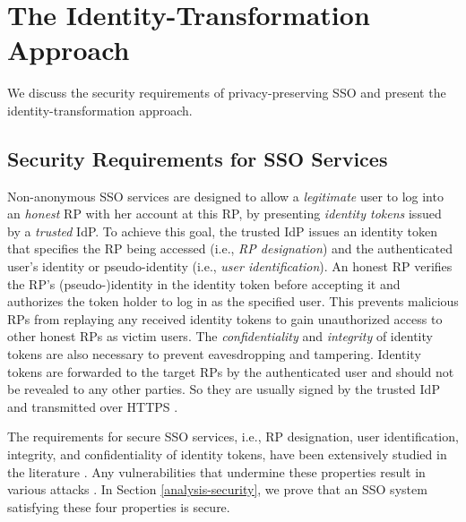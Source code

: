 \section{The Identity-Transformation Approach}
\label{sec:challenge}

We discuss the security requirements of privacy-preserving SSO and present the identity-transformation approach.


\subsection{Security Requirements for SSO Services}
\label{subsec:basicrequirements}

Non-anonymous SSO services \cite{OpenIDConnect,rfc6749,SAML,SAMLIdentifier,NIST2017draft} are designed to allow a \emph{legitimate} user to log into an \emph{honest} RP with her account at this RP, %
by presenting \emph{identity tokens} issued by a \emph{trusted} IdP.
To achieve this goal, the trusted IdP issues an identity token that specifies the RP being accessed (i.e., \emph{RP designation}) and the authenticated user's identity or pseudo-identity (i.e., \emph{user identification}).
An honest RP verifies the RP's (pseudo-)identity in the identity token before accepting it and authorizes the token holder to log in as the specified user. This prevents malicious RPs from replaying any received identity tokens to gain unauthorized access to other honest RPs as victim users.
The \emph{confidentiality} and \emph{integrity} of identity tokens are also necessary to prevent eavesdropping and tampering. Identity tokens are forwarded to the target RPs by the authenticated user and should not be revealed to any other parties. So they are usually signed by the trusted IdP and transmitted over HTTPS \cite{OpenIDConnect, rfc6749, SAML}.

The requirements for secure SSO services, i.e., RP designation, user identification, integrity, and confidentiality of identity tokens, have been extensively studied in the literature \cite{ArmandoCCCT08, SPRESSO, FettKS14, FettKS16, FettKS17}.
Any vulnerabilities that undermine these properties result in various attacks \cite{SomorovskyMSKJ12, WangCW12, ArmandoCCCPS13, ZhouE14, WangZLLYLG15, WangZLG16, YangLLZH16, MainkaMS16, MainkaMSW17, YangLCZ18, YangLS17, ShiWL19, ChenPCTKT14, ccsSunB12, DiscoveringJCS, dimvaLiM16, CaoSBKVC14, TowardsShehabM14}.
\newc
In Section \ref{analysis-security}, we prove that an SSO system satisfying these four properties is secure.
\oldc

